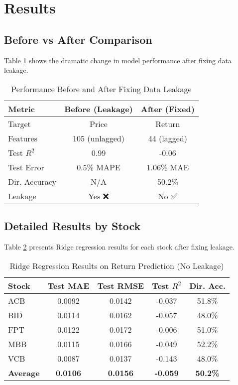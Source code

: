 \documentclass[conference]{IEEEtran}
\begin{document}
\section{Results}

\subsection{Before vs After Comparison}

Table \ref{tab:before_after} shows the dramatic change in model performance after fixing data leakage.

\begin{table}[htbp]
\caption{Performance Before and After Fixing Data Leakage}
\begin{center}
\begin{tabular}{lcc}
\toprule
\textbf{Metric} & \textbf{Before (Leakage)} & \textbf{After (Fixed)} \\
\midrule
Target & Price & Return \\
Features & 105 (unlagged) & 44 (lagged) \\
Test $R^2$ & 0.99 & -0.06 \\
Test Error & 0.5\% MAPE & 1.06\% MAE \\
Dir. Accuracy & N/A & 50.2\% \\
Leakage & Yes ❌ & No ✅ \\
\bottomrule
\end{tabular}
\label{tab:before_after}
\end{center}
\end{table}

\subsection{Detailed Results by Stock}

Table \ref{tab:results_by_stock} presents Ridge regression results for each stock after fixing leakage.

\begin{table}[htbp]
\caption{Ridge Regression Results on Return Prediction (No Leakage)}
\begin{center}
\small
\begin{tabular}{lcccc}
\toprule
\textbf{Stock} & \textbf{Test MAE} & \textbf{Test RMSE} & \textbf{Test $R^2$} & \textbf{Dir. Acc.} \\
\midrule
ACB & 0.0092 & 0.0142 & -0.037 & 51.8\% \\
BID & 0.0114 & 0.0162 & -0.057 & 48.0\% \\
FPT & 0.0122 & 0.0172 & -0.006 & 51.0\% \\
MBB & 0.0115 & 0.0166 & -0.049 & 52.2\% \\
VCB & 0.0087 & 0.0137 & -0.143 & 48.0\% \\
\midrule
\textbf{Average} & \textbf{0.0106} & \textbf{0.0156} & \textbf{-0.059} & \textbf{50.2\%} \\
\bottomrule
\end{tabular}
\label{tab:results_by_stock}
\end{center}
\end{table}
\end{document}
